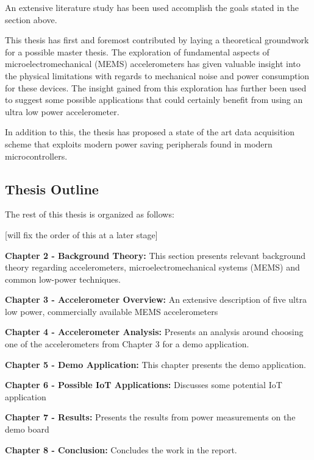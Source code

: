 An extensive literature study has been used accomplish the goals stated in the section above.

This thesis has first and foremost contributed by laying a theoretical groundwork for a possible master thesis. The exploration of fundamental aspects of microelectromechanical (MEMS) accelerometers has given valuable insight into the physical limitations with regards to mechanical noise and power consumption for these devices. The insight gained from this exploration has further been used to suggest some possible applications that could certainly benefit from using an ultra low power accelerometer. 

In addition to this, the thesis has proposed a state of the art data acquisition scheme that exploits modern power saving peripherals found in modern microcontrollers.

\subsection{Thesis Outline}

The rest of this thesis is organized as follows:

[will fix the order of this at a later stage]

\textbf{Chapter 2 - Background Theory:} This section presents relevant background theory regarding accelerometers, microelectromechanical systems (MEMS) and common low-power techniques.  

\textbf{Chapter 3 - Accelerometer Overview:} An extensive description of five ultra low power, commercially available MEMS accelerometers

\textbf{Chapter 4 - Accelerometer Analysis:} Presents an analysis around choosing one of the accelerometers from Chapter 3 for a demo application.

\textbf{Chapter 5 - Demo Application:} This chapter presents the demo application.

\textbf{Chapter 6 - Possible IoT Applications:} Discusses some potential IoT application

\textbf{Chapter 7 - Results:} Presents the results from power measurements on the demo board

\textbf{Chapter 8 - Conclusion:} Concludes the work in the report.


